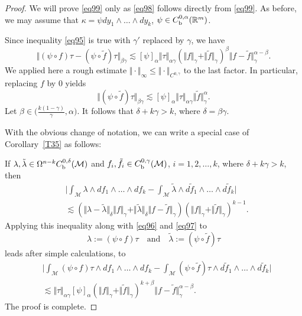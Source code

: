 \documentclass[intlimits,12pt,reqno]{amsart}
\newcommand{\cM}{\mathcal M}
\newcommand{\R}{\mathbb R}
\numberwithin{equation}{section}
\theoremstyle{definition}
\begin{document}
\begin{proof}
We will prove \eqref{eq99} only as \eqref{eq98} follows directly from \eqref{eq99}.
As before, we may assume that $\kappa=\psi dy_1\wedge\ldots\wedge dy_k$, $\psi\in C_{\rm b}^{0,\alpha}(\R^m)$.

Since inequality \eqref{eq95} is true with $\gamma'$ replaced by $\gamma$, we have 
\begin{equation}
\label{eq96}
\Vert (\psi\circ f)\tau-(\psi\circ \tilde{f})\tau\Vert_{\beta\gamma}\lesssim
[\psi]_{\alpha}\Vert\tau\Vert_{\alpha\gamma}(\Vert f\Vert_{\gamma}+\Vert \tilde{f}\Vert_{\gamma})^{\beta}
\Vert f-\tilde{f}\Vert_\gamma^{\alpha-\beta}.
\end{equation}
We applied here a rough estimate $\Vert\cdot\Vert_\infty\leq\Vert\cdot\Vert_{C^{0,\gamma}}$ to the last factor.
In particular, replacing $f$ by $0$ yields
\begin{equation}
\label{eq97}
\Vert (\psi\circ\tilde{f})\tau\Vert_{\beta\gamma}\lesssim
[\psi]_\alpha\Vert\tau\Vert_{\alpha\gamma}\Vert\tilde{f}\Vert_\gamma^\alpha.
\end{equation}
Let $\beta\in \big(\frac{k(1-\gamma)}{\gamma},\alpha\big)$. It follows that $\delta+k\gamma>k$, where $\delta=\beta\gamma$.


With the obvious change of notation, we can write a special case of Corollary~\ref{T35} as follows:

If $\lambda,\tilde{\lambda}\in \Omega^{n-k}C_{\rm b}^{0,\delta}(\cM)$ and $f_i,\tilde{f}_i\in C_{\rm b}^{0,\gamma}(\cM)$, $i=1,2,\ldots,k$, where $\delta+k\gamma>k$, then
\begin{equation}
\label{eq93}
\begin{split}
&\Bigg|\int_{\cM}\lambda\wedge df_1\wedge\ldots\wedge df_k-
\int_{\cM}\tilde{\lambda}\wedge d\tilde{f}_1\wedge\ldots\wedge d\tilde{f}_k
\Bigg|\\
&\lesssim
(\Vert\lambda-\tilde{\lambda}\Vert_\delta\Vert f\Vert_\gamma+\Vert\tilde{\lambda}\Vert_\delta\Vert f-\tilde{f}\Vert_\gamma)
(\Vert f\Vert_\gamma+\Vert\tilde{f}\Vert_\gamma)^{k-1}.
\end{split}
\end{equation}
Applying this inequality along with \eqref{eq96} and \eqref{eq97} to
$$
\lambda:=(\psi\circ f)\tau
\quad
\text{and}
\quad
\tilde{\lambda}:=(\psi\circ\tilde{f})\tau
$$
leads after simple calculations, to
\[
\begin{split}
&\Bigg|\int_{\cM}(\psi\circ f)\tau\wedge df_1\wedge\ldots\wedge df_k-
\int_{\cM}(\psi\circ \tilde{f})\tau\wedge d\tilde{f}_1\wedge\ldots\wedge d\tilde{f}_k\Bigg|\\
&\lesssim
\Vert\tau\Vert_{\alpha\gamma}[\psi]_\alpha(\Vert f\Vert_\gamma+\Vert\tilde{f}\Vert_\gamma)^{k+\beta}
\Vert f-\tilde{f}\Vert_\gamma^{\alpha-\beta}.
\end{split}
\]
The proof is complete.
\end{proof}
\end{document}
